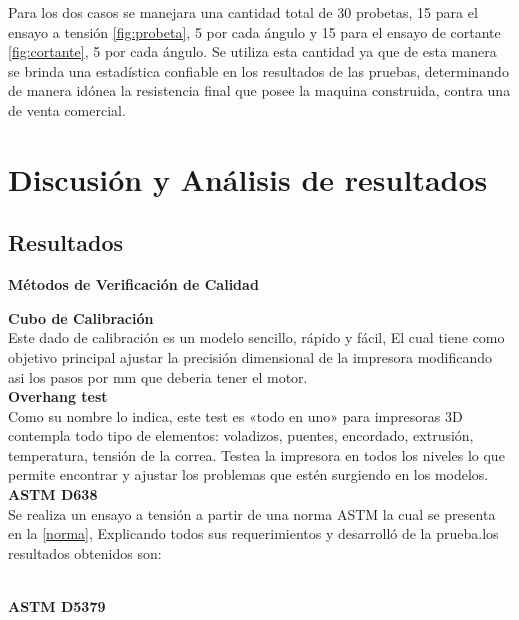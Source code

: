 Para los dos casos se manejara una cantidad total de 30 probetas, 15 para el ensayo a tensión \autoref{fig:probeta}, 5 por cada ángulo y 15 para el ensayo de cortante \autoref{fig:cortante}, 5 por cada ángulo. Se utiliza esta cantidad ya que de esta manera se brinda una estadística confiable en los resultados de las pruebas, determinando de manera idónea la resistencia final que posee la maquina construida, contra una de venta comercial.



\clearpage %
\chapter{Discusión y Análisis de resultados}
\section{Resultados} \label{fotos}
\begin{center}
\textbf{Métodos de Verificación de Calidad}    
\end{center} 

\textbf{Cubo de Calibración}\\

Este dado de calibración es un modelo sencillo, rápido y fácil, El cual tiene como objetivo principal ajustar la precisión dimensional de la impresora modificando asi los pasos por mm que deberia tener el motor.\\

\textbf{Overhang test}\\

Como su nombre lo indica, este test es «todo en uno» para impresoras 3D contempla todo tipo de elementos: voladizos, puentes, encordado, extrusión, temperatura, tensión de la correa. Testea la impresora en todos los niveles lo que permite encontrar y ajustar los problemas que estén surgiendo en los modelos.\\

\textbf{ASTM D638}\\

Se realiza un ensayo a tensión a partir de una norma \acrshort{ASTM} la cual se presenta en la \autoref{norma}, Explicando todos sus requerimientos y desarrolló de la prueba.los resultados obtenidos son:

\\

\textbf{ASTM D5379}\\

